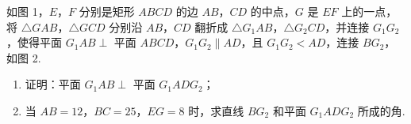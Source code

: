 \begin{problem}
如图 1，\(E\)，\(F\) 分别是矩形 \(ABCD\) 的边 \(AB\)，\(CD\) 的中点，\(G\) 是 \(EF\) 上的一点，将 \(\triangle GAB\)，\(\triangle GCD\) 分别沿 \(AB\)，\(CD\) 翻折成 \(\triangle G_{1}AB\)，\(\triangle G_{2}CD\)，并连接 \(G_{1}G_{2}\)，使得平面 \(G_{1}AB \perp\) 平面 \(ABCD\)，\(G_{1}G_{2} \parallel AD\)，且 \(G_{1}G_{2} < AD\)，连接 \(BG_{2}\)，如图 2.

\begin{enumerate}
\item 证明：平面 \(G_{1}AB \perp\) 平面 \(G_{1}ADG_{2}\)；
\item 当 \(AB = 12\)，\(BC = 25\)，\(EG = 8\) 时，求直线 \(BG_{2}\) 和平面 \(G_{1}ADG_{2}\) 所成的角.
\end{enumerate}


\end{problem}

